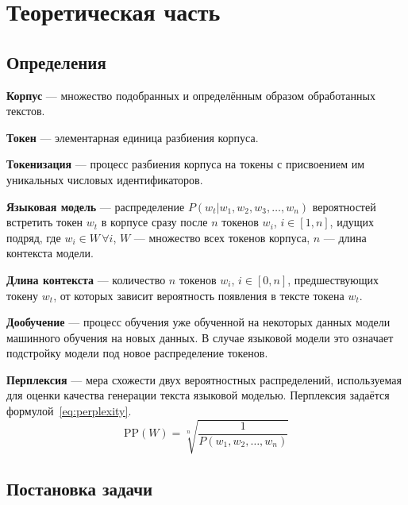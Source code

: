 \chapter{Теоретическая часть}
\label{cha:theory}

\section{Определения}

\textbf{Корпус} --- множество подобранных и определённым образом обработанных текстов.

\textbf{Токен} --- элементарная единица разбиения корпуса.

\textbf{Токенизация} --- процесс разбиения корпуса на токены с присвоением им уникальных числовых идентификаторов.

\textbf{Языковая модель} --- распределение $P(w_t | w_1,w_2,w_3,\dots,w_n)$ вероятностей встретить токен $w_t$ в корпусе сразу после $n$ токенов $w_i$, $i\in[1, n]$, идущих подряд, где $w_i \in W \, \forall i$, $W$ --- множество всех токенов корпуса, $n$ --- длина контекста модели.

\textbf{Длина контекста} --- количество $n$ токенов $w_i$, $i\in[0, n]$, предшествующих токену $w_t$, от которых зависит вероятность появления в тексте токена $w_t$.

\textbf{Дообучение} --- процесс обучения уже обученной на некоторых данных модели машинного обучения на новых данных. В случае языковой модели это означает подстройку модели под новое распределение токенов.

\textbf{Перплексия} --- мера схожести двух вероятностных распределений, используемая для оценки качества генерации текста языковой моделью. Перплексия задаётся формулой \ref*{eq:perplexity}.
\begin{equation}
    \label{eq:perplexity}
    \textrm{PP}(W)=\sqrt[n]{\frac{1}{P(w_1,w_2,\dots,w_n)}}
\end{equation}

\section{Постановка задачи}

